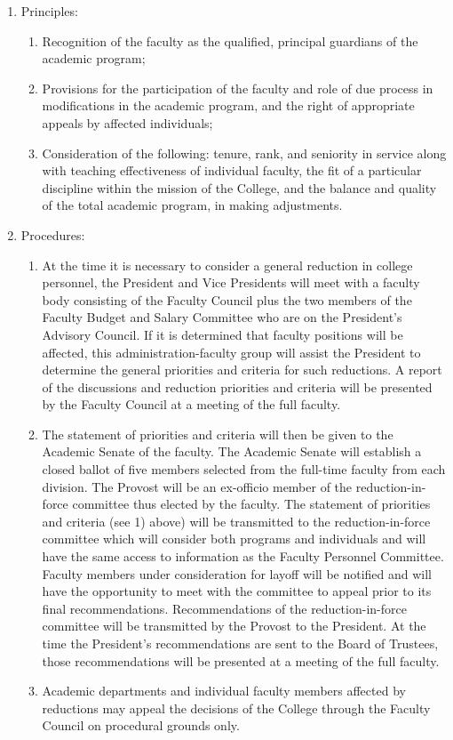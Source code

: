 			\begin{enumerate}[label=\alph*)]
				\item{ Principles:
					\begin{enumerate}[label=\arabic*)]
						\item{ Recognition of the faculty as the qualified, principal guardians of the academic program; }
						\item{ Provisions for the participation of the faculty and role of due process in modifications in the academic program, and the right of appropriate appeals by affected individuals; }
						\item{ Consideration of the following: tenure, rank, and seniority in service along with teaching effectiveness of individual faculty, the fit of a particular discipline within the mission of the College, and the balance and quality of the total academic program, in making adjustments. }
					\end{enumerate}
				}
				\item{ Procedures:
					\begin{enumerate}[label=\arabic*)]
						\item{ At the time it is necessary to consider a general reduction in college personnel, the President and Vice Presidents will meet with a faculty body consisting of the Faculty Council plus the two members of the Faculty Budget and Salary Committee who are on the President's Advisory Council.  If it is determined that faculty positions will be affected, this administration-faculty group will assist the President to determine the general priorities and criteria for such reductions. A report of the discussions and reduction priorities and criteria will be presented by the Faculty Council at a meeting of the full faculty. }
						\item{ The statement of priorities and criteria will then be given to the Academic Senate of the faculty.  The Academic Senate will establish a closed ballot of five members selected from the full-time faculty from each division.  The Provost will be an ex-officio member of the reduction-in-force committee thus elected by the faculty.  The statement of priorities and criteria (see 1) above) will be transmitted to the reduction-in-force committee which will consider both programs and individuals and will have the same access to information as the Faculty Personnel Committee.  Faculty members under consideration for layoff will be notified and will have the opportunity to meet with the committee to appeal prior to its final recommendations.  Recommendations of the reduction-in-force committee will be transmitted by the Provost to the President. At the time the President's recommendations are sent to the Board of Trustees, those recommendations will be presented at a meeting of the full faculty. }
						\item{ Academic departments and individual faculty members affected by reductions may appeal the decisions of the College through the Faculty Council on procedural grounds only. }
					\end{enumerate}
				}
			\end{enumerate}
